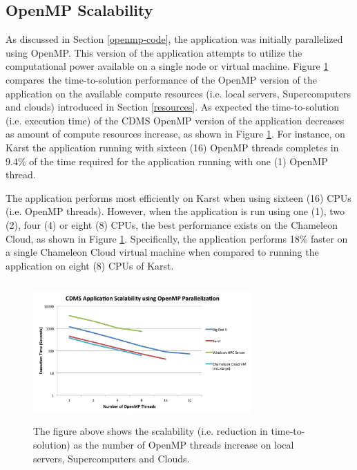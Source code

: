 \documentclass[9pt,twocolumn,twoside]{../../styles/osajnl}
\begin{document}
\subsection{OpenMP Scalability} \label{omp-scalability}
As discussed in Section \ref{openmp-code}, the application was
initially parallelized using OpenMP. This version of the application
attempts to utilize the computational power available on a single node
or virtual machine. Figure \ref{fig:scalability2} compares the
time-to-solution performance of the OpenMP version of the application
on the available compute resources (i.e. local servers, Supercomputers
and clouds) introduced in Section \ref{resources}. As expected the
time-to-solution (i.e. execution time) of the CDMS OpenMP version of
the application decreases as amount of compute resources increase, as
shown in Figure \ref{fig:scalability2}. For instance, on Karst the
application running with sixteen (16) OpenMP threads completes in
9.4\% of the time required for the application running with one (1)
OpenMP thread.

The application performs most efficiently on Karst when using sixteen
(16) CPUs (i.e. OpenMP threads). However, when the application is run
using one (1), two (2), four (4) or eight (8) CPUs, the best
performance exists on the Chameleon Cloud, as shown in Figure
\ref{fig:scalability2}. Specifically, the application performs 18\%
faster on a single Chameleon Cloud virtual machine when compared to
running the application on eight (8) CPUs of Karst.
\begin{figure}[h]
\centering
\includegraphics[height=2.1in, width=3.3in]{images/scalability2}
\caption{The figure above shows the scalability (i.e. reduction in
  time-to-solution) as the number of OpenMP threads increase on local
  servers, Supercomputers and Clouds.}
\label{fig:scalability2}
\end{figure}
\end{document}
